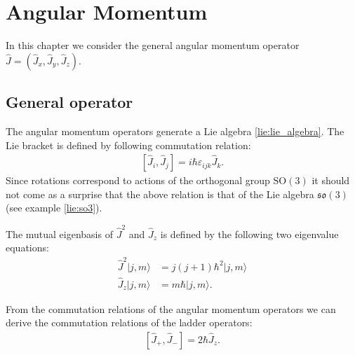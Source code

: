 \chapter{Angular Momentum}

    In this chapter we consider the general angular momentum operator $\hat{J} = \left(\hat{J}_x, \hat{J}_y, \hat{J}_z\right)$.

\section{General operator}

    \begin{property}
       The angular momentum operators generate a Lie algebra \ref{lie:lie_algebra}. The Lie bracket is defined by following commutation relation:
       \begin{gather}
           \label{QM:angular_momentum:commutation}
           \left[\hat{J}_i, \hat{J}_j\right] = i\hbar\varepsilon_{ijk}\hat{J}_k.
       \end{gather}
       Since rotations correspond to actions of the orthogonal group $\text{SO}(3)$ it should not come as a surprise that the above relation is that of the Lie algebra $\mathfrak{so}(3)$ (see example \ref{lie:so3}).
    \end{property}

    \begin{property}
       The mutual eigenbasis of $\hat{J}^2$ and $\hat{J}_z$ is defined by the following two eigenvalue equations:
       \begin{align}
           \label{QM:angular_momentum:j}
           \hat{J}^2|j, m\rangle &= j(j+1)\hbar^2|j, m\rangle\\
           \label{QM:angular_momentum:m}
           \hat{J}_z|j, m\rangle &= m\hbar|j, m\rangle.
        \end{align}
    \end{property}

    \begin{result}
        From the commutation relations of the angular momentum operators we can derive the commutation relations of the ladder operators:
        \begin{gather}
            \left[\hat{J}_+, \hat{J}_-\right] = 2\hbar\hat{J}_z.
        \end{gather}
    \end{result}

